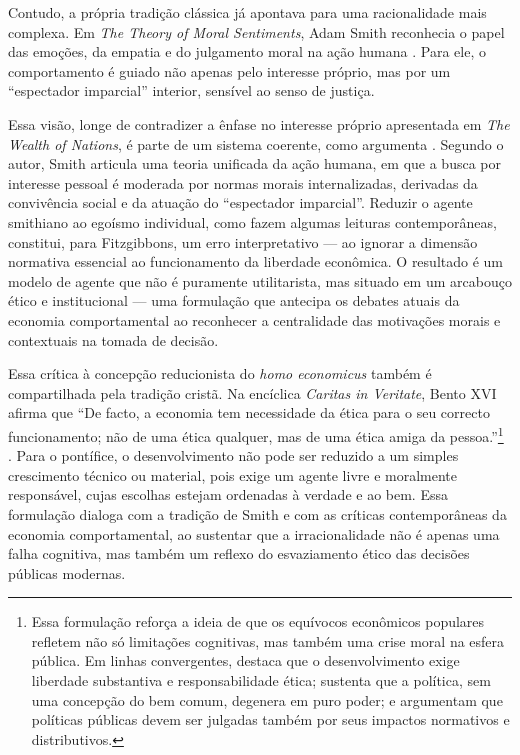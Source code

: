 Contudo, a própria tradição clássica já apontava para uma racionalidade mais complexa. Em \textit{The Theory of Moral Sentiments}, Adam Smith reconhecia o papel das emoções, da empatia e do julgamento moral na ação humana \cite{smith1759-theory-of-moral-sentiments}. Para ele, o comportamento é guiado não apenas pelo interesse próprio, mas por um ``espectador imparcial'' interior, sensível ao senso de justiça.

Essa visão, longe de contradizer a ênfase no interesse próprio apresentada em \textit{The Wealth of Nations}, é parte de um sistema coerente, como argumenta . Segundo o autor, Smith articula uma teoria unificada da ação humana, em que a busca por interesse pessoal é moderada por normas morais internalizadas, derivadas da convivência social e da atuação do ``espectador imparcial''. Reduzir o agente smithiano ao egoísmo individual, como fazem algumas leituras contemporâneas, constitui, para Fitzgibbons, um erro interpretativo — ao ignorar a dimensão normativa essencial ao funcionamento da liberdade econômica. O resultado é um modelo de agente que não é puramente utilitarista, mas situado em um arcabouço ético e institucional — uma formulação que antecipa os debates atuais da economia comportamental ao reconhecer a centralidade das motivações morais e contextuais na tomada de decisão.

Essa crítica à concepção reducionista do \textit{homo economicus} também é compartilhada pela tradição cristã. Na encíclica \textit{Caritas in Veritate}, Bento XVI afirma que ``De facto, a economia tem necessidade da ética para o seu correcto funcionamento; não de uma ética qualquer, mas de uma ética amiga da pessoa.''\footnote{Essa formulação reforça a ideia de que os equívocos econômicos populares refletem não só limitações cognitivas, mas também uma crise moral na esfera pública. Em linhas convergentes,  destaca que o desenvolvimento exige liberdade substantiva e responsabilidade ética;  sustenta que a política, sem uma concepção do bem comum, degenera em puro poder; e  argumentam que políticas públicas devem ser julgadas também por seus impactos normativos e distributivos.}
\cite[\S ~45]{bento2009caritas}. Para o pontífice, o desenvolvimento não pode ser reduzido a um simples crescimento técnico ou material, pois exige um agente livre e moralmente responsável, cujas escolhas estejam ordenadas à verdade e ao bem. Essa formulação dialoga com a tradição de Smith e com as críticas contemporâneas da economia comportamental, ao sustentar que a irracionalidade não é apenas uma falha cognitiva, mas também um reflexo do esvaziamento ético das decisões públicas modernas.

